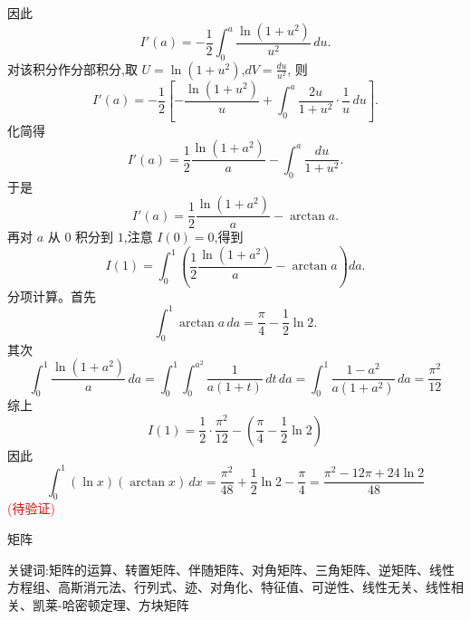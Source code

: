 \begin{questions}
\begin{solution}
\[    \]
    因此
    \[
    I'(a)
    =-\frac12\int_0^{a}\frac{\ln(1+u^2)}{u^2}\,du.
    \]
    对该积分作分部积分,取
    $U=\ln(1+u^2)$,$dV=\frac{du}{u^2}$,
    则
    \[
    I'(a)
    =-\frac12
    \left[
    -\frac{\ln(1+u^2)}{u}
    +\int_0^{a}\frac{2u}{1+u^2}\cdot\frac{1}{u}\,du
    \right].
    \]
    化简得
    \[
    I'(a)
    =\frac12\frac{\ln(1+a^2)}{a}
    -\int_0^{a}\frac{du}{1+u^2}.
    \]
    于是
    \[
    I'(a)=\frac12\frac{\ln(1+a^2)}{a}-\arctan a.
    \]
    再对 $a$ 从 $0$ 积分到 $1$,注意 $I(0)=0$,得到
    \[
    I(1)=\int_0^1
    \left(
    \frac12\frac{\ln(1+a^2)}{a}-\arctan a
    \right)da.
    \]
    分项计算。首先
    \[
    \int_0^1 \arctan a\,da
    =\frac{\pi}{4}-\frac12\ln2.
    \]
    其次
    \[
    \int_0^1 \frac{\ln(1+a^2)}{a}\,da
    =\int_0^1\int_0^{a^2}\frac{1}{a(1+t)}\,dt\,da
    =\int_0^1\frac{1-a^2}{a(1+a^2)}\,da
    =\frac{\pi^2}{12}
    \]
    综上
    \[
    I(1)
    =\frac12\cdot\frac{\pi^2}{12}
    -\left(\frac{\pi}{4}-\frac12\ln2\right)
    \]
    因此
    \[
    \int_0^1 (\ln x)(\arctan x)\,dx
    =\frac{\pi^2}{48}+\frac12\ln2-\frac{\pi}{4}
    =\frac{\pi^2-12\pi+24\ln2}{48}
    \]
    \textcolor{red}{(待验证)}
\end{solution}

\end{questions}
\pagebreak

\begin{center}
  {\fontsize{30pt}{26pt}\selectfont
    \hypertarget{矩阵}{矩阵} \label{矩阵}
  }
\end{center}
\separator
\begin{center}
    关键词:矩阵的运算、转置矩阵、伴随矩阵、对角矩阵、三角矩阵、逆矩阵、线性方程组、高斯消元法、行列式、迹、对角化、特征值、可逆性、线性无关、线性相关、凯莱-哈密顿定理、方块矩阵
\end{center}
\vspace{0.5pt}

